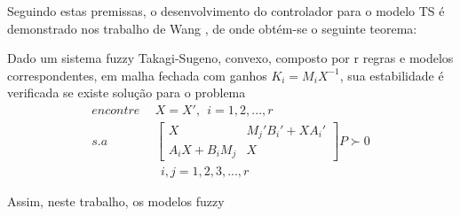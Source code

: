 Seguindo estas premissas, o desenvolvimento do controlador para o modelo TS é demonstrado nos trabalho de Wang \cite{wang}, de onde obtém-se o seguinte teorema:
\begin{myteo} \label{teoControlador}
Dado um sistema fuzzy Takagi-Sugeno, convexo, composto por r regras e modelos correspondentes, em malha fechada com ganhos $K_i = M_i X^{-1}$, sua estabilidade é verificada se existe solução para o problema
	\begin{align} \label{eqContFuzzy}
		encontre \ \ &X = X', \ \ i = 1,2,...,r \nonumber \\
		s.a \ \ & 
		\begin{bmatrix}
			X	&	M_j'B_i' + XA_i' \\
			A_iX + B_iM_j &	X
		\end{bmatrix}P \succ 0 \nonumber \\
		& \ \ i,j = 1,2,3, ... , r
	\end{align}
\end{myteo}

Assim, neste trabalho, os modelos fuzzy 

%

